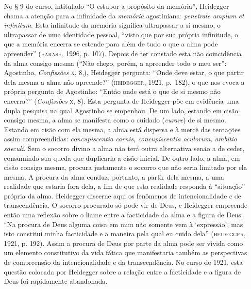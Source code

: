 No § 9 do curso, intitulado “O estupor a propósito da memória”,
Heidegger chama a atenção para a infinidade da \emph{memória}
agostiniana: \emph{penetrale amplum et infinitum}. Esta
infinitude da memória significa ultrapassar a si mesmo, o
ultrapassar de uma identidade pessoal, “visto que por sua
própria infinitude, o que a memória encerra se estende para além
de tudo o que a alma pode apreender” (\textsc{barash}, 1996, p. 107).
Depois de ter constado esta não coincidência da alma consigo
mesma (“Não chego, porém, a apreender todo o meu ser”:
Agostinho, \emph{Confissões} \textsc{x}, 8,), Heidegger pergunta: “Onde
deve estar, o que partir dela mesma a alma não apreende?”
(\textsc{heidegger}, 1921, p.~182), o que nos evoca a própria pergunta de
Agostinho: “Então onde está o que de si mesmo não encerra?”
(\emph{Confissões} \textsc{x}, 8). Esta pergunta de Heidegger põe em
evidência uma dupla pesquisa na qual Agostinho se empenhou. De
um lado, estando em cisão consigo mesma, a alma se manifesta
como o cuidado (\emph{curare}) de si mesmo. Estando em cisão
com ela mesma, a alma está dispersa e à mercê das tentações
assim compreendidas: \emph{concupiscentia carnis,
concupiscentia oculorum, ambitio saeculi}. Sem o socorro divino
a alma não terá outra alternativa senão a de ceder, consumindo
sua queda que duplicaria a cisão inicial. De outro lado, a alma,
em cisão consigo mesma, procura justamente o socorro que não
seria limitado por ela mesma. A procura da alma conduz,
portanto, a partir dela mesma, a uma realidade que estaria fora
dela, a fim de que esta realidade responda à “situação” própria
da alma. Heidegger discerne aqui os fenômenos de
intencionalidade e de transcendência. O socorro procurado só
pode vir de Deus, e Heidegger empreende então uma reflexão sobre
o liame entre a facticidade da alma e a figura de Deus: “Na
procura de Deus alguma coisa em mim não somente vem à
`expressão', mas isto constitui minha facticidade e a maneira
pela qual eu cuido dela” (\textsc{heidegger}, 1921, p. 192). Assim a
procura de Deus por parte da alma pode ser vivida como um
elemento constitutivo da vida fática que manifestaria também as
perspectivas de compreensão da intencionalidade e da
transcendência. No curso de 1921, esta questão colocada por
Heidegger sobre a relação entre a facticidade e a figura de Deus
foi rapidamente abandonada. 

